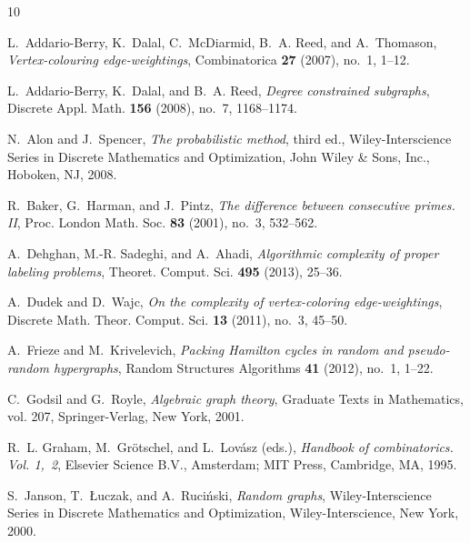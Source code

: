 \documentclass[12pt,reqno]{amsart}
\begin{document}
%
%

\providecommand{\bysame}{\leavevmode\hbox to3em{\hrulefill}\thinspace}
\providecommand{\MR}{\relax\ifhmode\unskip\space\fi MR }
\providecommand{\MRhref}[2]{%
  \href{http://www.ams.org/mathscinet-getitem?mr=#1}{#2}
}
\providecommand{\href}[2]{#2}
\begin{thebibliography}{10}

L.~Addario-Berry, K.~Dalal, C.~McDiarmid, B.~A. Reed, and A.~Thomason,
  \emph{Vertex-colouring edge-weightings}, Combinatorica \textbf{27} (2007),
  no.~1, 1--12.

L.~Addario-Berry, K.~Dalal, and B.~A. Reed, \emph{Degree constrained
  subgraphs}, Discrete Appl. Math. \textbf{156} (2008), no.~7, 1168--1174.

N.~Alon and J.~Spencer, \emph{The probabilistic method}, third ed.,
  Wiley-Interscience Series in Discrete Mathematics and Optimization, John
  Wiley \& Sons, Inc., Hoboken, NJ, 2008.

R.~Baker, G.~Harman, and J.~Pintz, \emph{The difference between consecutive
  primes. {II}}, Proc. London Math. Soc. \textbf{83} (2001), no.~3, 532--562.

A.~Dehghan, M.-R. Sadeghi, and A.~Ahadi, \emph{Algorithmic complexity of proper
  labeling problems}, Theoret. Comput. Sci. \textbf{495} (2013), 25--36.

A.~Dudek and D.~Wajc, \emph{On the complexity of vertex-coloring
  edge-weightings}, Discrete Math. Theor. Comput. Sci. \textbf{13} (2011),
  no.~3, 45--50.

A.~Frieze and M.~Krivelevich, \emph{Packing {H}amilton cycles in random and
  pseudo-random hypergraphs}, Random Structures Algorithms \textbf{41} (2012),
  no.~1, 1--22.

C.~Godsil and G.~Royle, \emph{Algebraic graph theory}, Graduate Texts in
  Mathematics, vol. 207, Springer-Verlag, New York, 2001.

R.~L. Graham, M.~Gr{\"o}tschel, and L.~Lov{\'a}sz (eds.), \emph{Handbook of
  combinatorics. {V}ol. 1,\ 2}, Elsevier Science B.V., Amsterdam; MIT Press,
  Cambridge, MA, 1995.

S.~Janson, T.~{\L}uczak, and A.~Ruci\'nski, \emph{Random graphs},
  Wiley-Interscience Series in Discrete Mathematics and Optimization,
  Wiley-Interscience, New York, 2000.


\end{thebibliography}
\end{document}
